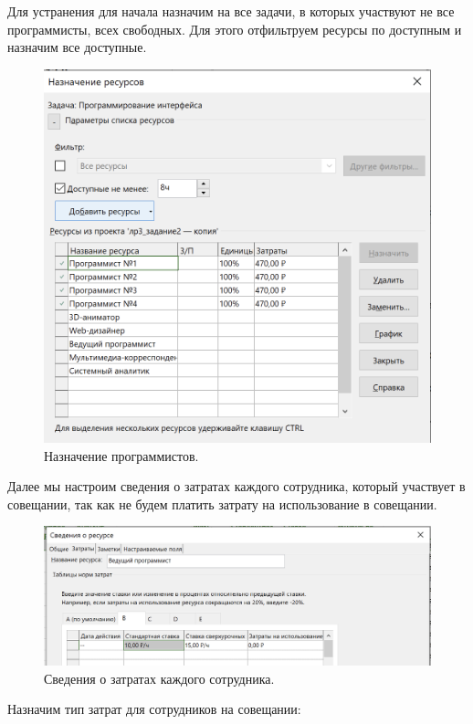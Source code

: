 \documentclass[a4paper,14pt]{extreport} %
\begin{document}
\begin{enumerate}
Для устранения для начала назначим на все задачи, в которых участвуют не все программисты, всех свободных. Для этого отфильтруем ресурсы по доступным и назначим все доступные.

\begin{figure}[H]
  \centering
  \caption{Назначение программистов. }
  \includegraphics[scale=0.6]{8}
\end{figure}

Далее мы настроим сведения о затратах каждого сотрудника, который участвует в совещании, так как не будем платить затрату на использование в совещании.

\begin{figure}[H]
  \centering
  \caption{Сведения о затратах каждого сотрудника. }
  \includegraphics[scale=0.7]{9}
\end{figure}

Назначим тип затрат для сотрудников на совещании:


\end{enumerate}
\end{document}
